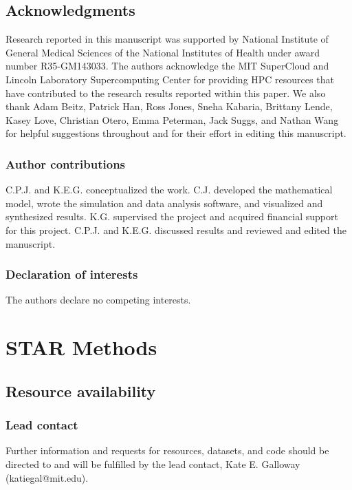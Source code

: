\documentclass[11pt]{article} %
\begin{document}


\subsection{Acknowledgments}
Research reported in this manuscript was supported by National Institute of General Medical Sciences of the National Institutes of Health under award number R35-GM143033. The authors acknowledge the MIT SuperCloud and Lincoln Laboratory Supercomputing Center \parencite{reutherInteractiveSupercomputing402018} for providing HPC resources that have contributed to the research results reported within this paper. We also thank Adam Beitz, Patrick Han,  Ross Jones, Sneha Kabaria, Brittany Lende, Kasey Love, Christian Otero, Emma Peterman, Jack Suggs, and Nathan Wang for helpful suggestions throughout and for their effort in editing this manuscript.

\subsubsection{Author contributions}
C.P.J. and K.E.G. conceptualized the work. C.J. developed the mathematical model, wrote the simulation and data analysis software, and visualized and synthesized results. K.G. supervised the project and acquired financial support for this project. C.P.J. and K.E.G. discussed results and reviewed and edited the manuscript.

\subsubsection{Declaration of interests}
The authors declare no competing interests.

\section{STAR Methods}

\subsection{Resource availability}

\subsubsection{Lead contact}
Further information and requests for resources, datasets, and code should be directed to and will be fulfilled by the lead contact, Kate E. Galloway (katiegal@mit.edu).
\end{document}
